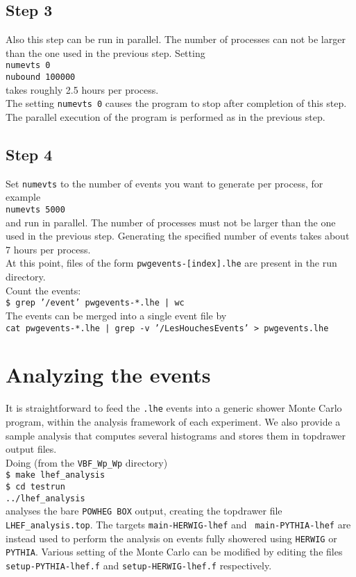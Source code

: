 \documentclass[a4paper,11pt]{article}
\begin{document}
\subsection*{Step 3}
%
Also this step can be run in parallel. The number of processes can 
not be larger than the one used in the previous step. Setting
\\[2ex]
{\tt numevts 0}
\\[2ex]
{\tt nubound 100000}
\\[2ex]
takes roughly 2.5 hours per process.
\\[2ex]
The setting {\tt numevts 0} causes the program to stop after
completion of this step.  The parallel execution of the program is
performed as in the previous step.

\subsection*{Step 4}
%
Set {\tt numevts} to the number of events you want to generate per
process, for example
\\[2ex]
{\tt numevts 5000}
\\[2ex]
and run in parallel. The number of processes must not be larger than
the one used in the previous step. Generating the specified number of
events takes about 7 hours per process.
\\[2ex]
At this point, files of the form {\tt pwgevents-[index].lhe} are
present in the run directory.
\\[2ex]
Count the events:
\\[2ex]
{\tt \$ grep '/event' pwgevents-*.lhe | wc}
\\[2ex]
The events can be merged into a single event file by
\\[2ex]
{\tt cat pwgevents-*.lhe | grep -v '/LesHouchesEvents' >
  pwgevents.lhe}


\section*{Analyzing the events}
%
It is straightforward to feed the {\tt *.lhe} events into a generic
shower Monte Carlo program, within the analysis framework of each
experiment. We also provide a sample analysis that computes several
histograms and stores them in topdrawer output files.
\\[2ex]
Doing (from the {\tt VBF\_Wp\_Wp} directory)
\\[2ex]
{\tt \$ make lhef\_analysis}
\\[2ex]
{\tt \$ cd testrun}
\\[2ex]
{\tt ../lhef\_analysis}
\\[2ex]
analyses the bare {\tt POWHEG BOX} output, creating the topdrawer file
{\tt LHEF\_analysis.top}. The targets {\tt main-HERWIG-lhef} and {\tt
  main-PYTHIA-lhef} are instead used to perform the analysis on events
fully showered using {\tt HERWIG} or {\tt PYTHIA}. Various setting of
the Monte Carlo can be modified by editing the files {\tt
  setup-PYTHIA-lhef.f} and {\tt setup-HERWIG-lhef.f} respectively.
\end{document}
